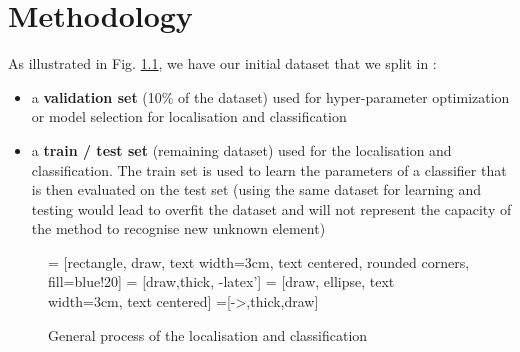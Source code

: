 \chapter{Methodology} \label{sec:methodology}

As illustrated in Fig. \ref{fig:tikz_methodology}, we have our initial dataset that we split in :
\begin{itemize}
    \item a \textbf{validation set} (10\% of the dataset) used for hyper-parameter optimization or model selection for localisation and classification
    \item a \textbf{train / test set} (remaining dataset) used for the localisation and classification. The train set is used to learn the parameters of a classifier that is then evaluated on the test set (using the same dataset for learning and testing would lead to overfit the dataset and will not represent the capacity of the method to recognise new unknown element)
\end{itemize}

\begin{figure}[h]
    \centering
     = [rectangle, draw, text width=3cm, text centered, rounded corners,  fill=blue!20]
     = [draw,thick, -latex']
     = [draw, ellipse, text width=3cm, text centered]
    =[->,thick,draw]
    \caption{General process of the localisation and classification}
    \label{fig:tikz_methodology}
\end{figure}

